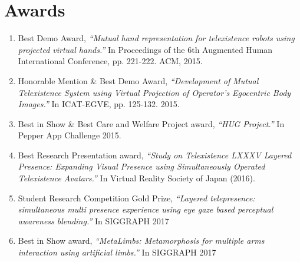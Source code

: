 \section{Awards}

\begin{enumerate}
\item Best Demo Award, \textit{``Mutual hand representation for telexistence robots using projected virtual hands.''} In Proceedings of the 6th Augmented Human International Conference, pp. 221-222. ACM, 2015.
\item Honorable Mention \& Best Demo Award, \textit{``Development of Mutual Telexistence System using Virtual Projection of Operator's Egocentric Body Images.''} In ICAT-EGVE, pp. 125-132. 2015.

\item Best in Show \& Best Care and Welfare Project award, \textit{``HUG Project.''} In Pepper App Challenge 2015.

\item Best Research Presentation award, \textit{``Study on Telexistence LXXXV Layered Presence: Expanding Visual Presence using Simultaneously Operated Telexistence Avatars.''} In Virtual Reality Society of Japan (2016).

\item Student Research Competition Gold Prize, \textit{``Layered telepresence: simultaneous multi presence experience using eye gaze based perceptual awareness blending.''} In SIGGRAPH 2017

\item Best in Show award, \textit{``MetaLimbs: Metamorphosis for multiple arms interaction using artificial limbs.''} In SIGGRAPH 2017

\end{enumerate}



